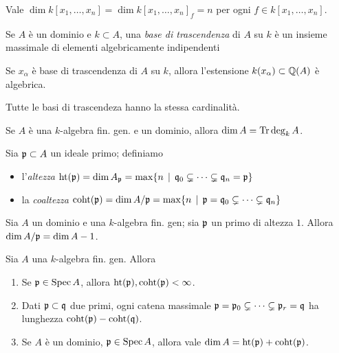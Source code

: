 \begin{proposition}
    Vale $\dim k[x_1,\dots,x_n]=\dim k[x_1,\dots,x_n]_f=n$ per ogni $f\in k[x_1,\dots,x_n]$.
\end{proposition}

\begin{definition}
    Se $A$ è un dominio e $k\subset A$, una \emph{base di trascendenza} di $A$ su $k$ è un insieme massimale di elementi algebricamente indipendenti
\end{definition}

\begin{lemma}
    Se $x_\alpha$ è base di trascendenza di $A$ su $k$, allora l'estensione $k(x_\alpha)\subset \mathbb{Q}(A)$ è algebrica.
\end{lemma}

\begin{theorem}
    Tutte le basi di trascendeza hanno la stessa cardinalità.
\end{theorem}

\begin{corollary}
    Se $A$ è una $k$-algebra fin. gen. e un dominio, allora $\dim A=\operatorname{Tr}\deg_k A$.
\end{corollary}


\begin{definition}
    Sia $\mathfrak{p}\subset A$ un ideale primo; definiamo
    \begin{itemize}
        \item l'\emph{altezza} $\operatorname{ht}(\mathfrak{p}) = \dim A_{\mathfrak{p}} = \max \{n\operatorname{\; |\;} \mathfrak{q}_0\subsetneq\dots\subsetneq\mathfrak{q}_n=\mathfrak{p}  \}$
        \item la \emph{coaltezza} $\operatorname{coht}(\mathfrak{p}) = \dim A / \mathfrak{p} = \max \{n\operatorname{\; |\;} \mathfrak{p} = \mathfrak{q}_0\subsetneq\dots\subsetneq\mathfrak{q}_n  \}$
    \end{itemize}
\end{definition}

\begin{lemma}
    Sia $A$ un dominio e una $k$-algebra fin. gen; sia $\mathfrak{p}$ un primo di altezza $1$. Allora $\dim A / \mathfrak{p}=\dim A - 1$.
\end{lemma}

\begin{theorem}
    Sia $A$ una $k$-algebra fin. gen. Allora
    \begin{enumerate}
        \item Se $\mathfrak{p}\in\operatorname{Spec} A$, allora $\operatorname{ht}(\mathfrak{p}),\operatorname{coht}(\mathfrak{p})<\infty$.
        \item Dati $\mathfrak{p}\subset\mathfrak{q}$ due primi, ogni catena massimale $\mathfrak{p}=\mathfrak{p}_0\subsetneq\dots\subsetneq\mathfrak{p}_r=\mathfrak{q}$ ha lunghezza $\operatorname{coht}(\mathfrak{p})-\operatorname{coht}(\mathfrak{q})$.
        \item Se $A$ è un dominio, $\mathfrak{p}\in\operatorname{Spec} A$, allora vale $\dim A = \operatorname{ht}(\mathfrak{p})+\operatorname{coht}(\mathfrak{p})$.
    \end{enumerate}
\end{theorem}

